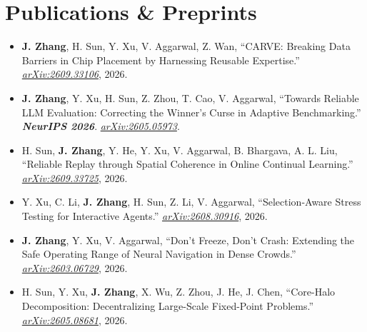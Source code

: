 \documentclass[11pt, letterpaper]{article}
\begin{document}
\section{Publications \& Preprints}
\begin{itemize}
    \item \textbf{J. Zhang}, H. Sun, Y. Xu, V. Aggarwal, Z. Wan, ``CARVE: Breaking Data Barriers in Chip Placement by Harnessing Reusable Expertise.'' \href{https://arxiv.org/abs/2609.33106}{\textit{arXiv:2609.33106}}, 2026.
    \item \textbf{J. Zhang}, Y. Xu, H. Sun, Z. Zhou, T. Cao, V. Aggarwal, ``Towards Reliable LLM Evaluation: Correcting the Winner's Curse in Adaptive Benchmarking.'' \textbf{\textit{NeurIPS 2026}}. \href{https://arxiv.org/abs/2605.05973}{\textit{arXiv:2605.05973}}.
    \item H. Sun, \textbf{J. Zhang}, Y. He, Y. Xu, V. Aggarwal, B. Bhargava, A. L. Liu, ``Reliable Replay through Spatial Coherence in Online Continual Learning.'' \href{https://arxiv.org/abs/2609.33725}{\textit{arXiv:2609.33725}}, 2026.
    \item Y. Xu, C. Li, \textbf{J. Zhang}, H. Sun, Z. Li, V. Aggarwal, ``Selection-Aware Stress Testing for Interactive Agents.'' \href{https://arxiv.org/abs/2608.30916}{\textit{arXiv:2608.30916}}, 2026.
    \item \textbf{J. Zhang}, Y. Xu, V. Aggarwal, ``Don't Freeze, Don't Crash: Extending the Safe Operating Range of Neural Navigation in Dense Crowds.'' \href{https://arxiv.org/abs/2603.06729}{\textit{arXiv:2603.06729}}, 2026.
    \item H. Sun, Y. Xu, \textbf{J. Zhang}, X. Wu, Z. Zhou, J. He, J. Chen, ``Core-Halo Decomposition: Decentralizing Large-Scale Fixed-Point Problems.'' \href{https://arxiv.org/abs/2605.08681}{\textit{arXiv:2605.08681}}, 2026.
\end{itemize}

\end{document}
